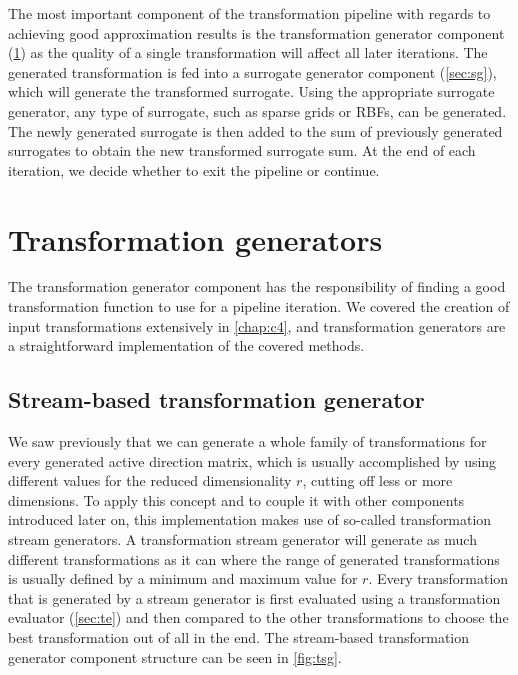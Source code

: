 \documentclass[
  a4paper,  %
  twoside,  %
  bibliography=totoc,
  headsepline,
  cleardoublepage=empty,
  parskip=half,
  draft=false
]{scrbook}
\begin{document}
%
The most important component of the transformation pipeline with regards to achieving good approximation results is the transformation generator component (\cref{sec:tg}) as the quality of a single transformation will affect all later iterations.
The generated transformation is fed into a surrogate generator component (\cref{sec:sg}), which will generate the transformed surrogate.
Using the appropriate surrogate generator, any type of surrogate, such as sparse grids or RBFs, can be generated.
The newly generated surrogate is then added to the sum of previously generated surrogates to obtain the new transformed surrogate sum.
At the end of each iteration, we decide whether to exit the pipeline or continue.

\newpage
\section {Transformation generators}
\label{sec:tg}

The transformation generator component has the responsibility of finding a good transformation function to use for a pipeline iteration.
We covered the creation of input transformations extensively in \cref{chap:c4}, and transformation generators are a straightforward implementation of the covered methods.

\subsection {Stream-based transformation generator}
\label{sec:tsg}

We saw previously that we can generate a whole family of transformations for every generated active direction matrix, which is usually accomplished by using different values for the reduced dimensionality $r$, \ie cutting off less or more dimensions.
To apply this concept and to couple it with other components introduced later on, this implementation makes use of so-called transformation stream generators.
A transformation stream generator will generate as much different transformations as it can where the range of generated transformations is usually defined by a minimum and maximum value for $r$.
Every transformation that is generated by a stream generator is first evaluated using a transformation evaluator (\cref{sec:te}) and then compared to the other transformations to choose the best transformation out of all in the end.
The stream-based transformation generator component structure can be seen in \cref{fig:tsg}.
\end{document}
